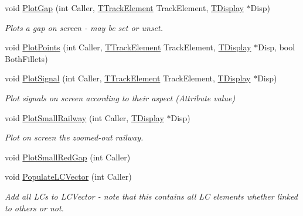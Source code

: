 \begin{DoxyCompactItemize}
\mbox{\label{class_t_track_aa638a7e118fb22e648d89adbe814a4a1}} 
void \mbox{\hyperlink{class_t_track_aa638a7e118fb22e648d89adbe814a4a1}{Plot\+Gap}} (int Caller, \mbox{\hyperlink{class_t_track_element}{T\+Track\+Element}} Track\+Element, \mbox{\hyperlink{class_t_display}{T\+Display}} $\ast$Disp)
\begin{DoxyCompactList}\small\item\em Plots a gap on screen -\/ may be set or unset. \end{DoxyCompactList}\item 
void \mbox{\hyperlink{class_t_track_af56adb319c7003b8ddac8e55afaee3d2}{Plot\+Points}} (int Caller, \mbox{\hyperlink{class_t_track_element}{T\+Track\+Element}} Track\+Element, \mbox{\hyperlink{class_t_display}{T\+Display}} $\ast$Disp, bool Both\+Fillets)
\item 
\mbox{\label{class_t_track_aa5742fbc2eb3f8743dde84005499f89e}} 
void \mbox{\hyperlink{class_t_track_aa5742fbc2eb3f8743dde84005499f89e}{Plot\+Signal}} (int Caller, \mbox{\hyperlink{class_t_track_element}{T\+Track\+Element}} Track\+Element, \mbox{\hyperlink{class_t_display}{T\+Display}} $\ast$Disp)
\begin{DoxyCompactList}\small\item\em Plot signals on screen according to their aspect (Attribute value) \end{DoxyCompactList}\item 
\mbox{\label{class_t_track_af654985aa4d1c17684f91474fa03ed98}} 
void \mbox{\hyperlink{class_t_track_af654985aa4d1c17684f91474fa03ed98}{Plot\+Small\+Railway}} (int Caller, \mbox{\hyperlink{class_t_display}{T\+Display}} $\ast$Disp)
\begin{DoxyCompactList}\small\item\em Plot on screen the zoomed-\/out railway. \end{DoxyCompactList}\item 
void \mbox{\hyperlink{class_t_track_ab831c2f47850f3a89678491475d52d29}{Plot\+Small\+Red\+Gap}} (int Caller)
\item 
\mbox{\label{class_t_track_a9a476cd9b32a351de87591f3db2ddb99}} 
void \mbox{\hyperlink{class_t_track_a9a476cd9b32a351de87591f3db2ddb99}{Populate\+L\+C\+Vector}} (int Caller)
\begin{DoxyCompactList}\small\item\em Add all L\+Cs to L\+C\+Vector -\/ note that this contains all LC elements whether linked to others or not. \end{DoxyCompactList}\item 

\end{DoxyCompactItemize}
